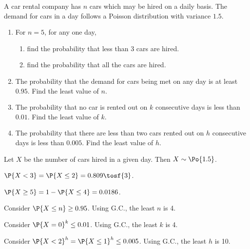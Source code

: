 \begin{problem}
    A car rental company has $n$ cars which may be hired on a daily basis. The demand for cars in a day follows a Poisson distribution with variance $1.5$. 
    \begin{enumerate}
        \item For $n=5$, for any one day,
        \begin{enumerate}
            \item find the probability that less than 3 cars are hired.
            \item find the probability that all the cars are hired.
        \end{enumerate}
        \item The probability that the demand for cars being met on any day is at least $0.95$. Find the least value of $n$.
        \item The probability that no car is rented out on $k$ consecutive days is less than $0.01$. Find the least value of $k$.
        \item The probability that there are less than two cars rented out on $h$ consecutive days is less than $0.005$. Find the least value of $h$.
    \end{enumerate}
\end{problem}
\begin{solution}
    Let $X$ be the number of cars hired in a given day. Then $X \sim \Po{1.5}$.
    \begin{ppart}
        \begin{psubpart}
            $\P{X < 3} = \P{X \leq 2} = 0.809 \tosf{3}$.
        \end{psubpart}
        \begin{psubpart}
            $\P{X \geq 5} = 1 - \P{X \leq 4} = 0.0186$.
        \end{psubpart}
    \end{ppart}
    \begin{ppart}
        Consider $\P{X \leq n} \geq 0.95$. Using G.C., the least $n$ is 4.
    \end{ppart}
    \begin{ppart}
        Consider $\P{X = 0}^k \leq 0.01$. Using G.C., the least $k$ is 4.
    \end{ppart}
    \begin{ppart}
        Consider $\P{X < 2}^h = \P{X \leq 1}^h \leq 0.005$. Using G.C., the least $h$ is 10.
    \end{ppart}
\end{solution}

